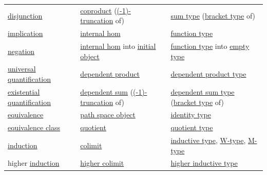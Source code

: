 \documentclass[11pt]{article}
\begin{document}
\begin{longtable}{lll}
\href{https://ncatlab.org/nlab/show/disjunction}{disjunction} & \href{https://ncatlab.org/nlab/show/coproduct}{coproduct} (\href{https://ncatlab.org/nlab/show/\%28-1\%29-truncation}{(-1)-truncation} of) & \href{https://ncatlab.org/nlab/show/sum+type}{sum type} (\href{https://ncatlab.org/nlab/show/bracket+type}{bracket type} of)\\
\href{https://ncatlab.org/nlab/show/implication}{implication} & \href{https://ncatlab.org/nlab/show/internal+hom}{internal hom} & \href{https://ncatlab.org/nlab/show/function+type}{function type}\\
\href{https://ncatlab.org/nlab/show/negation}{negation} & \href{https://ncatlab.org/nlab/show/internal+hom}{internal hom} into \href{https://ncatlab.org/nlab/show/initial+object}{initial object} & \href{https://ncatlab.org/nlab/show/function+type}{function type} into \href{https://ncatlab.org/nlab/show/empty+type}{empty type}\\
\href{https://ncatlab.org/nlab/show/universal+quantification}{universal quantification} & \href{https://ncatlab.org/nlab/show/dependent+product}{dependent product} & \href{https://ncatlab.org/nlab/show/dependent+product+type}{dependent product type}\\
\href{https://ncatlab.org/nlab/show/existential+quantification}{existential quantification} & \href{https://ncatlab.org/nlab/show/dependent+sum}{dependent sum} (\href{https://ncatlab.org/nlab/show/\%28-1\%29-truncation}{(-1)-truncation} of) & \href{https://ncatlab.org/nlab/show/dependent+sum+type}{dependent sum type} (\href{https://ncatlab.org/nlab/show/bracket+type}{bracket type} of)\\
\href{https://ncatlab.org/nlab/show/equivalence}{equivalence} & \href{https://ncatlab.org/nlab/show/path+space+object}{path space object} & \href{https://ncatlab.org/nlab/show/identity+type}{identity type}\\
\href{https://ncatlab.org/nlab/show/equivalence+class}{equivalence class} & \href{https://ncatlab.org/nlab/show/quotient}{quotient} & \href{https://ncatlab.org/nlab/show/quotient+type}{quotient type}\\
\href{https://ncatlab.org/nlab/show/induction}{induction} & \href{https://ncatlab.org/nlab/show/colimit}{colimit} & \href{https://ncatlab.org/nlab/show/inductive+type}{inductive type}, \href{https://ncatlab.org/nlab/show/W-type}{W-type}, \href{https://ncatlab.org/nlab/show/M-type}{M-type}\\
higher \href{https://ncatlab.org/nlab/show/induction}{induction} & \href{https://ncatlab.org/nlab/show/\%28infinity\%2C1\%29-colimit}{higher colimit} & \href{https://ncatlab.org/nlab/show/higher+inductive+type}{higher inductive type}\\

\end{longtable}
\end{document}
